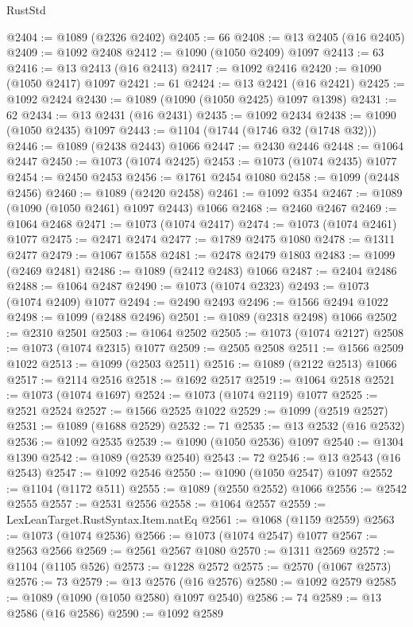 \begin{lexlean}{RustStd}
\begin{coremodule}
@2404 := @1089 (@2326 @2402)
@2405 := 66
@2408 := @13 @2405 (@16 @2405)
@2409 := @1092 @2408
@2412 := @1090 (@1050 @2409) @1097
@2413 := 63
@2416 := @13 @2413 (@16 @2413)
@2417 := @1092 @2416
@2420 := @1090 (@1050 @2417) @1097
@2421 := 61
@2424 := @13 @2421 (@16 @2421)
@2425 := @1092 @2424
@2430 := @1089 (@1090 (@1050 @2425) @1097 @1398)
@2431 := 62
@2434 := @13 @2431 (@16 @2431)
@2435 := @1092 @2434
@2438 := @1090 (@1050 @2435) @1097
@2443 := @1104 (@1744 (@1746 @32 (@1748 @32)))
@2446 := @1089 (@2438 @2443) @1066
@2447 := @2430 @2446
@2448 := @1064 @2447
@2450 := @1073 (@1074 @2425)
@2453 := @1073 (@1074 @2435) @1077
@2454 := @2450 @2453
@2456 := @1761 @2454 @1080
@2458 := @1099 (@2448 @2456)
@2460 := @1089 (@2420 @2458)
@2461 := @1092 @354
@2467 := @1089 (@1090 (@1050 @2461) @1097 @2443) @1066
@2468 := @2460 @2467
@2469 := @1064 @2468
@2471 := @1073 (@1074 @2417)
@2474 := @1073 (@1074 @2461) @1077
@2475 := @2471 @2474
@2477 := @1789 @2475 @1080
@2478 := @1311 @2477
@2479 := @1067 @1558
@2481 := @2478 @2479 @1803
@2483 := @1099 (@2469 @2481)
@2486 := @1089 (@2412 @2483) @1066
@2487 := @2404 @2486
@2488 := @1064 @2487
@2490 := @1073 (@1074 @2323)
@2493 := @1073 (@1074 @2409) @1077
@2494 := @2490 @2493
@2496 := @1566 @2494 @1022
@2498 := @1099 (@2488 @2496)
@2501 := @1089 (@2318 @2498) @1066
@2502 := @2310 @2501
@2503 := @1064 @2502
@2505 := @1073 (@1074 @2127)
@2508 := @1073 (@1074 @2315) @1077
@2509 := @2505 @2508
@2511 := @1566 @2509 @1022
@2513 := @1099 (@2503 @2511)
@2516 := @1089 (@2122 @2513) @1066
@2517 := @2114 @2516
@2518 := @1692 @2517
@2519 := @1064 @2518
@2521 := @1073 (@1074 @1697)
@2524 := @1073 (@1074 @2119) @1077
@2525 := @2521 @2524
@2527 := @1566 @2525 @1022
@2529 := @1099 (@2519 @2527)
@2531 := @1089 (@1688 @2529)
@2532 := 71
@2535 := @13 @2532 (@16 @2532)
@2536 := @1092 @2535
@2539 := @1090 (@1050 @2536) @1097
@2540 := @1304 @1390
@2542 := @1089 (@2539 @2540)
@2543 := 72
@2546 := @13 @2543 (@16 @2543)
@2547 := @1092 @2546
@2550 := @1090 (@1050 @2547) @1097
@2552 := @1104 (@1172 @511)
@2555 := @1089 (@2550 @2552) @1066
@2556 := @2542 @2555
@2557 := @2531 @2556
@2558 := @1064 @2557
@2559 := LexLeanTarget.RustSyntax.Item.natEq
@2561 := @1068 (@1159 @2559)
@2563 := @1073 (@1074 @2536)
@2566 := @1073 (@1074 @2547) @1077
@2567 := @2563 @2566
@2569 := @2561 @2567 @1080
@2570 := @1311 @2569
@2572 := @1104 (@1105 @526)
@2573 := @1228 @2572
@2575 := @2570 (@1067 @2573)
@2576 := 73
@2579 := @13 @2576 (@16 @2576)
@2580 := @1092 @2579
@2585 := @1089 (@1090 (@1050 @2580) @1097 @2540)
@2586 := 74
@2589 := @13 @2586 (@16 @2586)
@2590 := @1092 @2589

\end{coremodule}
\end{lexlean}
